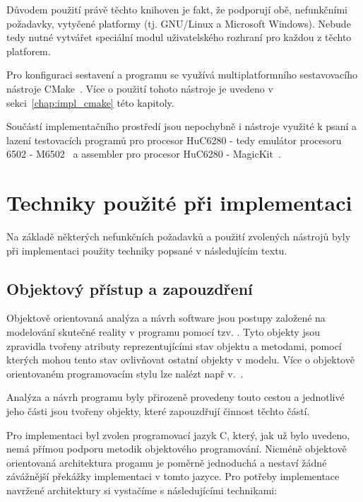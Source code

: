 Důvodem použití právě těchto knihoven je fakt, že podporují obě, nefunkčními
požadavky, vytyčené platformy (tj. GNU/Linux a Microsoft Windows). Nebude tedy
nutné vytvářet speciální modul uživatelského rozhraní pro každou z těchto
platforem.

Pro konfiguraci sestavení a programu se využívá multiplatformního sestavovacího
nástroje CMake~\cite{wwwCMake}. Více o použití tohoto nástroje je uvedeno v
sekci~\ref{chap:impl_cmake} této kapitoly.

Součástí implementačního prostředí jsou nepochybně i nástroje využité k psaní a
lazení testovacích programů pro procesor HuC6280 - tedy emulátor procesoru 6502
- M6502~\cite{wwwM6502} a assembler pro procesor HuC6280 -
MagicKit~\cite{wwwMagicKit}.


\section{Techniky použité při implementaci}\label{chap:impl_techniques}

Na základě některých nefunkčních požadavků a použití zvolených nástrojů byly
při implementaci použity techniky popsané v následujícím textu.

%
%

\subsection{Objektový přístup a zapouzdření}\label{chap:impl_techniques_obj}

Objektově orientovaná analýza a návrh software jsou postupy založené na
modelování skutečné reality v programu pomocí tzv. . Tyto objekty
jsou zpravidla tvořeny atributy reprezentujícími stav objektu a metodami,
pomocí kterých mohou tento stav ovlivňovat ostatní objekty v modelu. Více o
objektově orientovaném programovacím stylu lze nalézt např v.~\cite{Booch94}.

Analýza a návrh programu byly přirozeně provedeny touto cestou a jednotlivé
jeho části jsou tvořeny objekty, které zapouzdřují činnost těchto částí.

Pro implementaci byl zvolen programovací jazyk C, který, jak už bylo uvedeno,
nemá přímou podporu metodik objektového programování. Nicméně objektově
orientovaná architektura progamu je poměrně jednoduchá a nestaví žádné
závážnější překážky implementaci v tomto jazyce. Pro potřeby implementace
navržené architektury si vystačíme s následujícími technikami:

